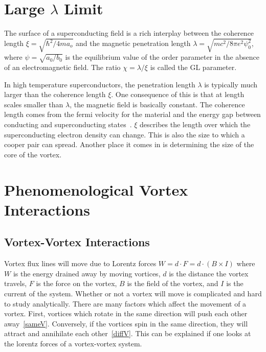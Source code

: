 \section{Large $\lambda$ Limit}
The surface of a superconducting field is a rich interplay between the coherence length $\xi = \sqrt{\hbar^2/4ma_o}$ and the magnetic penetration length $\lambda = \sqrt{mc^2 / 8\pi e^2 \psi^2_0}$, where $\psi = \sqrt{a_0/b_0}$ is the equilibrium value of the order parameter in the absence of an electromagnetic field. The ratio $\chi = \lambda / \xi$ is called the GL parameter. 

 In high temperature superconductors, the penetration length $\lambda$ is typically much larger than the coherence length $\xi$. One consequence of this is that at length scales smaller than $\lambda$, the magnetic field is basically constant. The coherence length comes from the fermi velocity for the material and the energy gap between conducting and superconducting states~\cite{Kittel96}.  $\xi$ describes the length over which the superconducting electron density can change. This is also the size to which a cooper pair can spread. Another place it comes in is determining the size of the core of the vortex. 

\section{Phenomenological Vortex Interactions}

\subsection{Vortex-Vortex Interactions}
	 Vortex flux lines will move due to Lorentz forces $W = d \cdot F = d \cdot (B \times I)$ where $W$ is the energy drained away by moving vortices, $d$ is the distance the vortex travels, $F$ is the force on the vortex, $B$ is the field of the vortex, and $I$ is the current of the system. Whether or not a vortex will move is complicated and hard to study analytically. There are many factors which affect the movement of a vortex. First, vortices which rotate in the same direction will push each other away~\ref{sameV}. Conversely, if the vortices spin in the same direction, they will attract and annihilate each other~\ref{diffV}. This can be explained if one looks at the lorentz forces of a vortex-vortex system.

